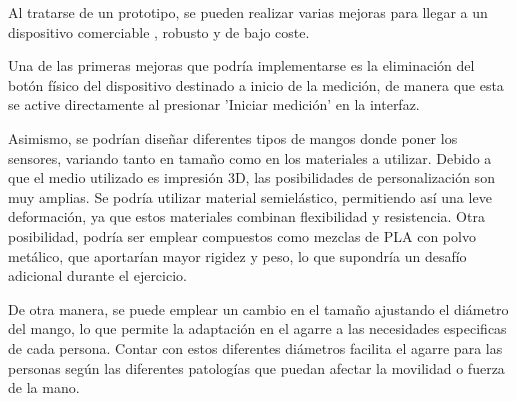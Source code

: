 Al tratarse de un prototipo, se pueden realizar varias mejoras para llegar a un dispositivo comerciable , robusto y de bajo coste.

Una de las primeras mejoras que podría implementarse es la eliminación del botón físico del dispositivo destinado a inicio de la medición, de manera que esta se active directamente al presionar 'Iniciar medición' en la interfaz. 

Asimismo, se podrían diseñar diferentes tipos de mangos donde poner los sensores, variando tanto en tamaño como en los materiales a utilizar. Debido a que el medio utilizado es impresión 3D, las posibilidades de personalización son muy amplias. Se podría utilizar material semielástico, permitiendo así una leve deformación, ya que estos materiales combinan flexibilidad y resistencia. Otra posibilidad, podría ser emplear compuestos como mezclas de PLA con polvo metálico, que aportarían mayor rigidez y peso, lo que supondría un desafío adicional durante el ejercicio.

De otra manera, se puede emplear un cambio en el tamaño ajustando el diámetro del mango, lo que permite la adaptación en el agarre a las necesidades especificas de cada persona. Contar con estos diferentes diámetros facilita el agarre para las personas según las diferentes patologías que puedan afectar la movilidad o fuerza de la mano.
